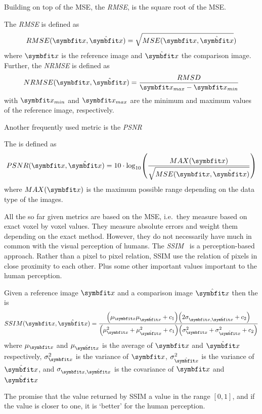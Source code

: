Building on top of the \gls{MSE}, the \textit{\gls{RMSE}}, is the square root of the
\gls{MSE}.
\begin{definition}
	The \textit{\gls{RMSE}} is defined as
	\[ RMSE(\mvec{x}, \hat{\mvec{x}}) = \sqrt{MSE(\mvec{x}, \hat{\mvec{x}}}) \]
	where \(\mvec{x}\) is the reference image and \(\hat{\mvec{x}}\) the comparison image.
	Further, the \textit{\gls{NRMSE}} is defined as
	\[ NRMSE(\mvec{x}, \hat{\mvec{x}}) = \frac{RMSD}{\mvec{x}_{max} - \mvec{x}_{min}} \]
	with \(\mvec{x}_{min}\) and \(\mvec{x}_{max}\) are the minimum and maximum values of the
	reference image, respectively.
\end{definition}
Another frequently used metric is the \textit{\gls{PSNR}}
\begin{definition}
	The \textit{} is defined as
	\[ PSNR(\mvec{x}, \hat{\mvec{x}}) = 10 \cdot \log_{10}\left( \frac{MAX(\mvec{x})}{\sqrt{MSE(\mvec{x}, \hat{\mvec{x}})}} \right) \]
	where \(MAX(\mvec{x})\) is the maximum possible range depending on the data type of the
	images.
\end{definition}

All the so far given metrics are based on the \gls{MSE}, i.e.\ they measure based on exact voxel by
voxel values. They measure absolute errors and weight them depending on the exact method. However,
they do not necessarily have much in common with the visual perception of humans. The
\textit{\gls{SSIM}}~\cite{wang_image_2004,avanaki_exact_2009} is a perception-based approach. Rather
than a pixel to pixel relation, \gls{SSIM} use the relation of pixels in close proximity to each
other. Plus some other important values important to the human perception.
\begin{definition}
	Given a reference image \(\mvec{x}\) and a comparison image \(\hat{\mvec{x}}\) then the
	\textit{} is
	\[ SSIM(\mvec{x}, \hat{\mvec{x}}) =
		\frac{
			\left( \mu_{\mvec{x}} \mu_{\hat{\mvec{x}}} + c_1 \right)
			\left( 2 \sigma_{\mvec{x}, \hat{\mvec{x}}} + c_2 \right)
		}{
			\left( \mu_{\mvec{x}}^2 + \mu_{\hat{\mvec{x}}}^2 + c_1 \right)
			\left( \sigma_{\mvec{x}}^2 + \sigma_{\hat{\mvec{x}}}^2 + c_2 \right)
		}
	\]
	where \(\mu_{\mvec{x}}\) and \(\mu_{\hat{\mvec{x}}}\) is the average of \(\mvec{x}\)
	and \(\hat{\mvec{x}}\) respectively, \(\sigma_{\mvec{x}}^2\) is the variance of \(\mvec{x}\),
	\(\sigma_{\hat{\mvec{x}}}^2\) is the variance of \(\hat{\mvec{x}}\), and \(\sigma_{\mvec{x},
		\hat{\mvec{x}}}\) is the covariance of \(\mvec{x}\) and \(\hat{\mvec{x}}\)
\end{definition}
The promise that the value returned by \gls{SSIM} a value in the range \([0, 1]\), and if the value
is closer to one, it is `better' for the human perception.

